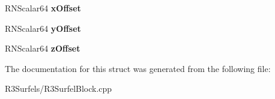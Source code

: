 \begin{DoxyCompactItemize}
\item 
R\+N\+Scalar64 {\bfseries x\+Offset}\hypertarget{struct_u_p_c_header_ae7b2488fa8889d1ae6e5ad9cc1b16361}{}\label{struct_u_p_c_header_ae7b2488fa8889d1ae6e5ad9cc1b16361}

\item 
R\+N\+Scalar64 {\bfseries y\+Offset}\hypertarget{struct_u_p_c_header_ad8351e8daf4d5ef426e2cd1e9c76ae2c}{}\label{struct_u_p_c_header_ad8351e8daf4d5ef426e2cd1e9c76ae2c}

\item 
R\+N\+Scalar64 {\bfseries z\+Offset}\hypertarget{struct_u_p_c_header_a4cd908af91cc9e0981fd2d7aab706e4b}{}\label{struct_u_p_c_header_a4cd908af91cc9e0981fd2d7aab706e4b}

\end{DoxyCompactItemize}


The documentation for this struct was generated from the following file\+:\begin{DoxyCompactItemize}
\item 
R3\+Surfels/R3\+Surfel\+Block.\+cpp\end{DoxyCompactItemize}

